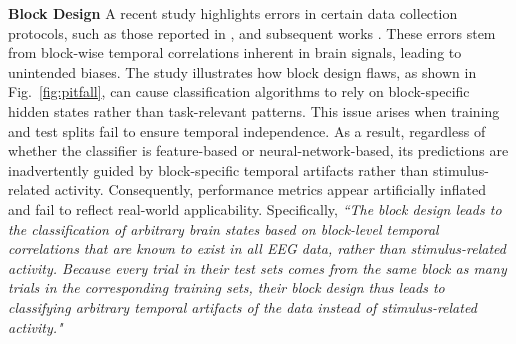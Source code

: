 \documentclass[journal]{IEEEtran}
\begin{document}
\textbf{Block Design} A recent study \cite{Li2021} highlights errors in certain data collection protocols, such as those reported in \cite{Spampinato2017}, and subsequent works \cite{Palazzo2017, Kavasidis2017, Du2018, Kumar2018, Tirupattur2018, Palazzo2021}. These errors stem from block-wise temporal correlations inherent in brain signals, leading to unintended biases. The study illustrates how block design flaws, as shown in Fig.~\ref{fig:pitfall}, can cause classification algorithms to rely on block-specific hidden states rather than task-relevant patterns. This issue arises when training and test splits fail to ensure temporal independence. As a result, regardless of whether the classifier is feature-based or neural-network-based, its predictions are inadvertently guided by block-specific temporal artifacts rather than stimulus-related activity. Consequently, performance metrics appear artificially inflated and fail to reflect real-world applicability. Specifically, \textit{``The block design leads to the classification of arbitrary brain states based on block-level temporal correlations that are known to exist in all EEG data, rather than stimulus-related activity. Because every trial in their test sets comes from the same block as many trials in the corresponding training sets, their block design thus leads to classifying arbitrary temporal artifacts of the data instead of stimulus-related activity."}

\begin{figure*}[htpb]
\centering
{}
\caption{Common error of block design on brain signal classification experiments. (a) Incorrect experiment protocol, where each block contains only one class of stimuli. Classifiers can rely solely on the block-specific brain states to differentiate between task-related classes, irrespective of the actual stimulus-related brain patterns. This limitation persists regardless of the random or sequential division between training and test sets. (b) The correct experiment protocol, where each block would contain all classes of stimuli and the stimuli would be preferably presented in random order. During analysis, training and test samples are segregated to not overlap by block. It ensures that classifiers do not learn to discriminate based merely on block-specific temporal patterns.} \label{fig:pitfall}
\end{figure*}
\end{document}
